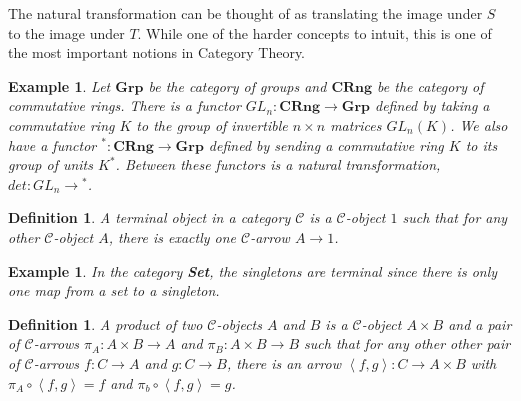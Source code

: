 \documentclass[12pt,a4paper]{article}
\newtheorem{example}[theorem]{Example}
\newtheorem{definition}[theorem]{Definition}
\newcommand\CC{\mathcal{C}}
\begin{document}
 The natural transformation can be thought of as translating the image under $S$ to the image under $T$.
 While one of the harder concepts to intuit, this is one of the most important notions in Category Theory.

 \begin{example}
     Let $\textbf{Grp}$ be the category of groups and $\textbf{CRng}$ be the category of commutative rings.
     There is a functor $GL_n:\textbf{CRng}\to\textbf{Grp}$ defined by taking a commutative ring $K$ to the group of invertible $n\times n$ matrices $GL_n(K)$.
     We also have a functor ${}^*:\textbf{CRng}\to\textbf{Grp}$ defined by sending a commutative ring $K$ to its group of units $K^*$.
     Between these functors is a natural transformation, $det:GL_n\to{}^*$.
     \begin{center}
     \end{center}   
 \end{example}

\begin{definition}
A \textit{terminal object} in a category $\CC$ is a $\CC$-object $1$ such that for any other $\CC$-object $A$, there is exactly one $\CC$-arrow $A\to 1$.
\end{definition}

\begin{example}
    In the category \textbf{Set}, the singletons are terminal since there is only one map from a set to a singleton.
\end{example}

\begin{definition}
A \textit{product} of two $\CC$-objects $A$ and $B$ is a $\CC$-object $A\times B$ and a pair of $\CC$-arrows $\pi_A:A\times B\to A$ and $\pi_B:A\times B\to B$ such that for any other other pair of $\CC$-arrows $f:C\to A$ and $g:C\to B$, there is an arrow $\left<f,g\right>:C\to A\times B$ with $\pi_A\circ \left<f,g\right>=f$ and $\pi_b\circ\left<f,g\right>=g$.
 \begin{center}
\end{center}
\end{definition}
 
\end{document}
